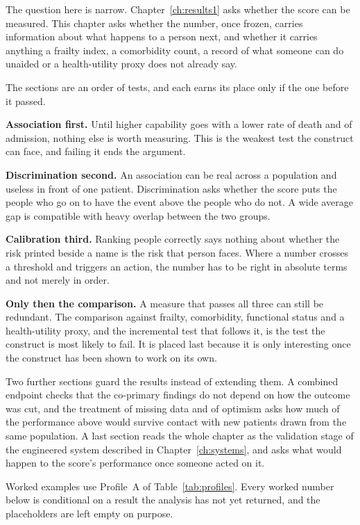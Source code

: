 
\label{ch:results2}

\begin{ataglance}
The question here is narrow. Chapter~\ref{ch:results1} asks whether the score can be measured. This chapter asks whether the number, once frozen, carries information about what happens to a person next, and whether it carries anything a frailty index, a comorbidity count, a record of what someone can do unaided or a health-utility proxy does not already say.

The sections are an order of tests, and each earns its place only if the one before it passed.

\textbf{Association first.} Until higher capability goes with a lower rate of death and of admission, nothing else is worth measuring. This is the weakest test the construct can face, and failing it ends the argument.

\textbf{Discrimination second.} An association can be real across a population and useless in front of one patient. Discrimination asks whether the score puts the people who go on to have the event above the people who do not. A wide average gap is compatible with heavy overlap between the two groups.

\textbf{Calibration third.} Ranking people correctly says nothing about whether the risk printed beside a name is the risk that person faces. Where a number crosses a threshold and triggers an action, the number has to be right in absolute terms and not merely in order.

\textbf{Only then the comparison.} A measure that passes all three can still be redundant. The comparison against frailty, comorbidity, functional status and a health-utility proxy, and the incremental test that follows it, is the test the construct is most likely to fail. It is placed last because it is only interesting once the construct has been shown to work on its own.

Two further sections guard the results instead of extending them. A combined endpoint checks that the co-primary findings do not depend on how the outcome was cut, and the treatment of missing data and of optimism asks how much of the performance above would survive contact with new patients drawn from the same population. A last section reads the whole chapter as the validation stage of the engineered system described in Chapter~\ref{ch:systems}, and asks what would happen to the score's performance once someone acted on it.

Worked examples use Profile~A of Table~\ref{tab:profiles}. Every worked number below is conditional on a result the analysis has not yet returned, and the placeholders are left empty on purpose.
\end{ataglance}

